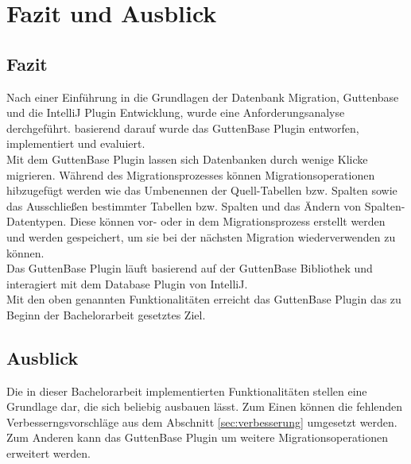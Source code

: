 \chapter{Fazit und Ausblick}
\label{sec:fazit}
\section{Fazit}
Nach einer Einführung in die Grundlagen der Datenbank Migration, Guttenbase und die IntelliJ Plugin Entwicklung, wurde eine Anforderungsanalyse derchgeführt. basierend darauf wurde das GuttenBase Plugin entworfen, implementiert und evaluiert. \\
Mit dem GuttenBase Plugin lassen sich Datenbanken durch wenige Klicke migrieren. Während des Migrationsprozesses können Migrationsoperationen hibzugefügt werden wie das Umbenennen der Quell-Tabellen bzw. Spalten sowie das Ausschließen bestimmter Tabellen bzw. Spalten und das Ändern von Spalten-Datentypen. Diese können vor- oder in dem  Migrationsprozess erstellt werden und werden gespeichert, um sie bei der nächsten Migration wiederverwenden zu können.\\
Das GuttenBase Plugin läuft basierend auf der GuttenBase Bibliothek und interagiert mit dem Database Plugin von IntelliJ.\\
Mit den oben genannten Funktionalitäten erreicht das GuttenBase Plugin das zu Beginn der Bachelorarbeit gesetztes Ziel.
\section{Ausblick}
Die in dieser Bachelorarbeit implementierten Funktionalitäten stellen eine Grundlage dar, die sich beliebig ausbauen lässt. Zum Einen können die fehlenden Verbesserngsvorschläge aus dem Abschnitt \ref{sec:verbesserung} umgesetzt werden. Zum Anderen kann das GuttenBase Plugin um weitere Migrationsoperationen erweitert werden. 

